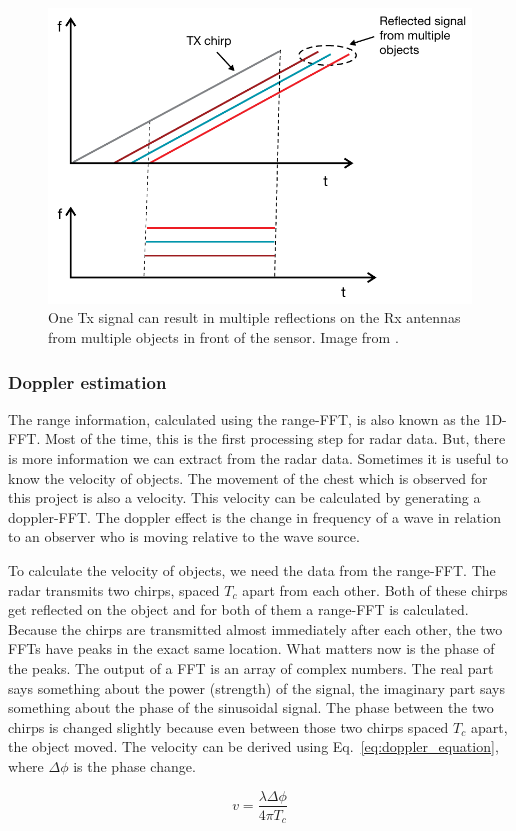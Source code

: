 \begin{figure}[t]
\centering
\includegraphics[width=.5\textwidth]{figures/background/reflected_signals.png}
\caption{One Tx signal can result in multiple reflections on the Rx antennas from multiple objects in front of the sensor. Image from \cite{mmwave_fundamentals_website}.}
\label{fig:if_multiple}
\end{figure}

\subsubsection{Doppler estimation}
The range information, calculated using the range-FFT, is also known as the 1D-FFT. Most of the time, this is the first processing step for radar data. But, there is more information we can extract from the radar data. Sometimes it is useful to know the velocity of objects. The movement of the chest which is observed for this project is also a velocity. This velocity can be calculated by generating a doppler-FFT. The doppler effect is the change in frequency of a wave in relation to an observer who is moving relative to the wave source.

To calculate the velocity of objects, we need the data from the range-FFT. The radar transmits two chirps, spaced $T_c$ apart from each other. Both of these chirps get reflected on the object and for both of them a range-FFT is calculated. Because the chirps are transmitted almost immediately after each other, the two FFTs have peaks in the exact same location. What matters now is the phase of the peaks. The output of a FFT is an array of complex numbers. The real part says something about the power (strength) of the signal, the imaginary part says something about the phase of the sinusoidal signal. The phase between the two chirps is changed slightly because even between those two chirps spaced $T_c$ apart, the object moved. The velocity can be derived using Eq.~\ref{eq:doppler_equation}, where $\Delta \phi$ is the phase change.

\begin{equation}
v = \frac{\lambda \Delta \phi}{4 \pi T_c}
\label{eq:doppler_equation}
\end{equation}

